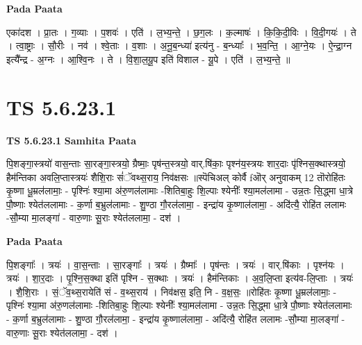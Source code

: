 \documentclass[17pt]{extarticle}
\begin{document}
\textbf{Pada Paata} \newline

एका॑दश । प्रा॒तः । ग॒व्याः । प॒शवः॑ । एति॑ । ल॒भ्य॒न्ते॒ । छ॒ग॒लः । क॒ल्माषः॑ । कि॒कि॒दी॒विः । वि॒दी॒गयः॑ । ते । त्वा॒ष्ट्राः । सौ॒रीः । नव॑ । श्वे॒ताः । व॒शाः । अ॒नू॒ब॒न्ध्या॑ इत्य॑नु - ब॒न्ध्याः᳚ । भ॒व॒न्ति॒ । आ॒ग्ने॒यः । ऐ॒न्द्रा॒ग्न इत्यै᳚न्द्र - अ॒ग्नः । आ॒श्वि॒नः । ते । वि॒शा॒ल॒यू॒प इति॑ विशाल - यू॒पे । एति॑ । ल॒भ्य॒न्ते॒ ॥  \newline




\section*{ TS 5.6.23.1 }

\textbf{TS 5.6.23.1 } \newline
\textbf{Samhita Paata} \newline

पि॒शङ्गा॒स्त्रयो॑ वास॒न्ताः सा॒रङ्गा॒स्त्रयो॒ ग्रैष्माः॒ पृष॑न्त॒स्त्रयो॒ वार्.षि॑काः॒ पृश्न॑य॒स्त्रयः शार॒दाः पृ॑श्निस॒क्थास्त्रयो॒ हैम॑न्तिका अवलि॒प्तास्त्रयः॑ शैशि॒राः सं॑ॅवथ्स॒राय॒ निव॑क्षसः ॥स्पॆचिअल् कोर्वै fऒर् अनुवाकम् 12 तॊरोहि॑तः कृ॒ष्णा धू॒म्रल॑लामाः॒ - पृश्निः॑ श्या॒मा अ॑रु॒णल॑लामाः -शितिबा॒हुः शि॒ल्पाः श्येनीः᳚ श्या॒मल॑लामा - उन्न॒तः सि॒द्ध्मा धा॒त्रे पौ॒ष्णाः श्येत॑ललामाः - क॒र्णा ब॒भ्रुल॑लामाः - शु॒ण्ठा गौ॒रल॑लामा॒ - इन्द्रा॑य कृ॒ष्णाल॑लामा॒ - अदि॑त्यै॒ रोहि॑त ललामः -सौ॒म्या मा॒लङ्गा॑ - वारु॒णाः सू॒राः श्येत॑ललामा॒ - दश॑ । \newline

\textbf{Pada Paata} \newline

पि॒शङ्गाः᳚ । त्रयः॑ । वा॒स॒न्ताः । सा॒रङ्गाः᳚ । त्रयः॑ । ग्रैष्माः᳚ । पृष॑न्तः । त्रयः॑ । वार्.षि॑काः । पृश्न॑यः । त्रयः॑ । शा॒र॒दाः । पृ॒श्नि॒स॒क्था इति॑ पृश्नि - स॒क्थाः । त्रयः॑ । हैम॑न्तिकाः । अ॒व॒लि॒प्ता इत्य॑व-लि॒प्ताः । त्रयः॑ । शै॒शि॒राः । सं॒ॅव॒थ्स॒रायेति॑ सं - व॒थ्स॒राय॑ । निव॑क्षस॒ इति॒ नि - व॒क्ष॒सः॒ ॥रोहि॑तः कृ॒ष्णा धू॒म्रल॑लामाः॒ - पृश्निः॑ श्या॒मा अ॑रु॒णल॑लामाः -शितिबा॒हुः शि॒ल्पाः श्येनीः᳚ श्या॒मल॑लामा - उन्न॒तः सि॒द्ध्मा धा॒त्रे पौ॒ष्णाः श्येत॑ललामाः - क॒र्णा ब॒भ्रुल॑लामाः - शु॒ण्ठा गौ॒रल॑लामा॒ - इन्द्रा॑य कृ॒ष्णाल॑लामा॒ - अदि॑त्यै॒ रोहि॑त ललामः -सौ॒म्या मा॒लङ्गा॑ - वारु॒णाः सू॒राः श्येत॑ललामा॒ - दश॑ ।  \newline
\end{document}
